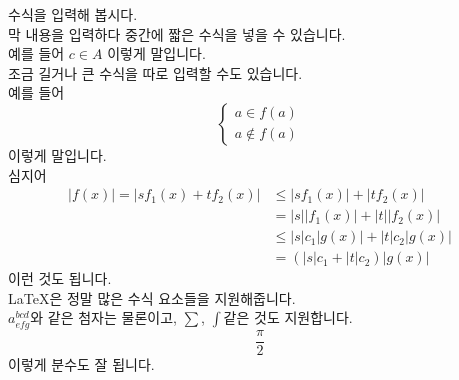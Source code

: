 \documentclass{article}
\begin{document}
	\doublespacing
	\noindent 수식을 입력해 봅시다.\\
	막 내용을 입력하다 중간에 짧은 수식을 넣을 수 있습니다.\\
	예를 들어 $c \in A$ 이렇게 말입니다.\\
	조금 길거나 큰 수식을 따로 입력할 수도 있습니다.\\
	예를 들어
	\[\left\{ \begin{array}{ll}
		a \in f(a)
		\\a \notin f(a)
	\end{array} \right.\]
	이렇게 말입니다.\\
	심지어
	\begin{align}
		|f(x)|=|sf_1(x)+tf_2(x)| &\le |sf_1(x)|+|tf_2(x)| \nonumber
		\\&=|s||f_1(x)|+|t||f_2(x)| \nonumber
		\\&\le |s|c_1|g(x)|+|t|c_2|g(x)| \nonumber
		\\&=(|s|c_1+|t|c_2)|g(x)| \nonumber
	\end{align}
	이런 것도 됩니다.\\
	\LaTeX 은 정말 많은 수식 요소들을 지원해줍니다.\\
	$a^{bcd}_{efg}$와 같은 첨자는 물론이고, $\sum$, $\int$같은 것도 지원합니다.
	\[\frac{\pi}{2}\]
	이렇게 분수도 잘 됩니다.
\end{document}
